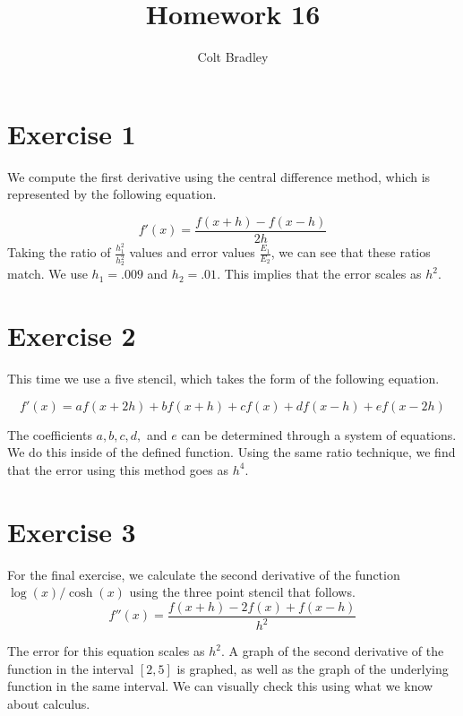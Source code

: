 \documentclass[11pt]{article}
\begin{document}
\title{Homework 16}
\author{Colt Bradley}
\date{}
\maketitle

\section{Exercise 1}

We compute the first derivative using the central difference method, which is represented by the following equation. 

\begin{equation}
f'(x) = \frac{f(x+h)-f(x-h)}{2h}
\end{equation}
Taking the ratio of $\frac{h_1^2}{h_2^2}$ values and error values $\frac{E_1}{E_2}$, we can see that these ratios match. We use $h_1 = .009$ and $h_2 = .01$. This implies that the error scales as $h^2$. 

\section{Exercise 2}
This time we use a five stencil, which takes the form of the following equation. 

\begin{equation}
f'(x) = af(x+2h)+bf(x+h)+cf(x)+df(x-h)+ef(x-2h)
\end{equation}

The coefficients $a, b, c, d,$ and $e$ can be determined through a system of equations. We do this inside of the defined function. Using the same ratio technique, we find that the error using this method goes as $h^4$. 
\section{Exercise 3}
For the final exercise, we calculate the second derivative of the function $\log(x)/\cosh(x)$ using the three point stencil that follows. 
\begin{equation}
f''(x) = \frac{f(x+h)-2f(x)+f(x-h)}{h^2}
\end{equation}

The error for this equation scales as $h^2$. A graph of the second derivative of the function in the interval $[2,5]$ is graphed, as well as the graph of the underlying function in the same interval. We can visually check this using what we know about calculus. 
\end{document}
